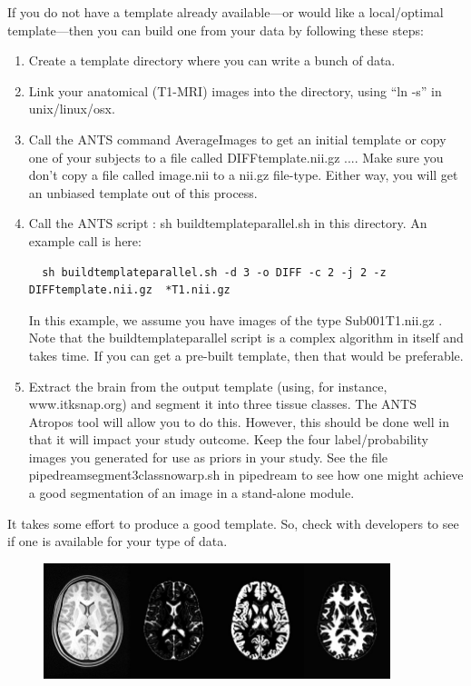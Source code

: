 \documentclass{InsightArticle}
\begin{document}
If you do not have a template already available---or would like a local/optimal 
template---then you can build one from your data by following these steps:
\begin{enumerate}
\item Create a template directory where you can write a bunch of data.
\item Link your anatomical (T1-MRI) images into the directory, using ``ln -s'' in unix/linux/osx.
\item Call the ANTS command AverageImages to get an initial template
  or copy one of your subjects to a file called DIFFtemplate.nii.gz
  .... Make sure you don't copy a file called image.nii to a nii.gz
  file-type.  Either way, you will get an unbiased template out of this process.  
\item Call the ANTS script :   sh buildtemplateparallel.sh in this directory.  
  An example call is here: 
\begin{verbatim}
  sh buildtemplateparallel.sh -d 3 -o DIFF -c 2 -j 2 -z DIFFtemplate.nii.gz  *T1.nii.gz 
\end{verbatim}
  In this example, we assume you have images of the type   Sub001T1.nii.gz .
  Note that the buildtemplateparallel script is a complex algorithm in itself and takes time.  
  If you can get a pre-built template, then that would be preferable. 
\item  Extract the brain from the output template (using, for instance, www.itksnap.org) and segment it into three tissue classes.  
  The ANTS Atropos tool will allow you to do this.  However, this should be done well in that 
  it will impact your study outcome.   Keep the four label/probability images you generated for use as priors in your study. 
  See the file pipedreamsegment3classnowarp.sh in pipedream to see how one might achieve a good segmentation of an image 
  in a stand-alone module.  
\end{enumerate}
It takes some effort to produce a good template.  So, check with developers to see 
if one is available for your type of data.

\begin{figure}
\includegraphics[width=0.9\textwidth]{templatefig.jpg} 
\vspace{-0.1in}
\label{fig:template}
\end{figure}
\end{document}
